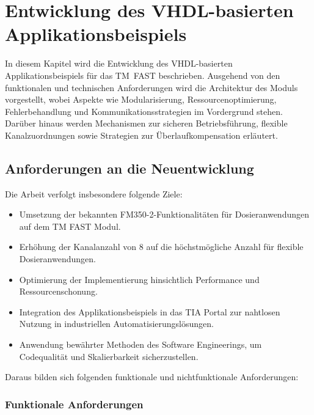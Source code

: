 \chapter{Entwicklung des VHDL-basierten Applikationsbeispiels}
\label{chap:entwicklung}

In diesem Kapitel wird die Entwicklung des VHDL-basierten Applikationsbeispiels für das 
TM~FAST beschrieben. Ausgehend von den funktionalen und technischen Anforderungen 
wird die Architektur des Moduls vorgestellt, wobei Aspekte wie Modularisierung, 
Ressourcenoptimierung, Fehlerbehandlung und Kommunikationsstrategien im Vordergrund 
stehen. Darüber hinaus werden Mechanismen zur sicheren Betriebsführung, flexible 
Kanalzuordnungen sowie Strategien zur Überlaufkompensation erläutert.

\section{Anforderungen an die Neuentwicklung}

Die Arbeit verfolgt insbesondere folgende Ziele:
\begin{itemize}
    \item Umsetzung der bekannten FM350-2-Funktionalitäten für Dosieranwendungen auf dem TM FAST Modul.
    \item Erhöhung der Kanalanzahl von 8 auf die höchstmögliche Anzahl für flexible Dosieranwendungen.
    \item Optimierung der Implementierung hinsichtlich Performance und Ressourcenschonung.
    \item Integration des Applikationsbeispiels in das TIA Portal zur nahtlosen Nutzung in industriellen Automatisierungslösungen.
    \item Anwendung bewährter Methoden des Software Engineerings, um Codequalität und Skalierbarkeit sicherzustellen.
\end{itemize}

Daraus bilden sich folgenden funktionale und nichtfunktionale Anforderungen:

\subsection{Funktionale Anforderungen}

